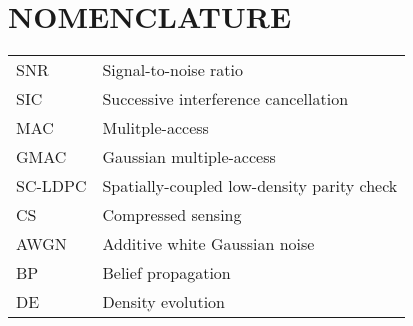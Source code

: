 %
%
%
%


\chapter*{NOMENCLATURE}


\hspace*{-1.25in}
\vspace{12pt}
\begin{spacing}{1.0}
	\begin{longtable}[htbp]{@{}p{} p{}@{}}
		SNR & Signal-to-noise ratio	\\	[2ex]
		SIC 	&	 Successive interference cancellation  \\	[2ex]
		MAC & Mulitple-access\\	[2ex]
		GMAC	&	Gaussian multiple-access\\	[2ex] %
		SC-LDPC & Spatially-coupled low-density parity check\\ [2ex]
		CS & Compressed sensing\\[2ex]
		AWGN & Additive white Gaussian noise\\ [2ex]
		BP & Belief propagation\\ [2ex]
		DE & Density evolution
	\end{longtable}
\end{spacing}

\pagebreak{}